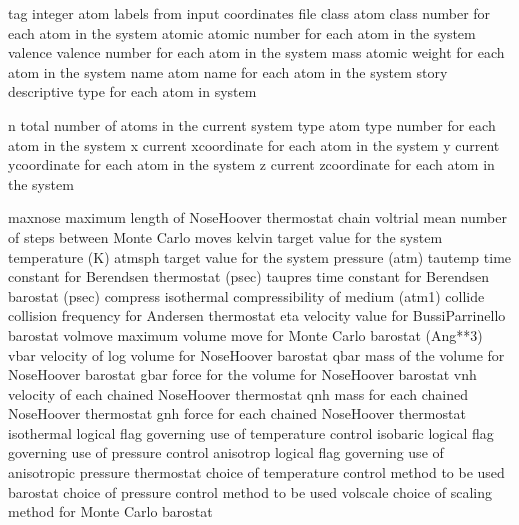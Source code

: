 \documentclass[letterpaper,11pt,english]{sphinxmanual}
\begin{document}

\begin{sphinxVerbatim}[commandchars=\\\{\}]
tag             integer atom labels from input coordinates file
class           atom class number for each atom in the system
atomic          atomic number for each atom in the system
valence         valence number for each atom in the system
mass            atomic weight for each atom in the system
name            atom name for each atom in the system
story           descriptive type for each atom in system
\end{sphinxVerbatim}


\begin{sphinxVerbatim}[commandchars=\\\{\}]
n               total number of atoms in the current system
type            atom type number for each atom in the system
x               current x\PYGZhy{}coordinate for each atom in the system
y               current y\PYGZhy{}coordinate for each atom in the system
z               current z\PYGZhy{}coordinate for each atom in the system
\end{sphinxVerbatim}


\begin{sphinxVerbatim}[commandchars=\\\{\}]
maxnose         maximum length of Nose\PYGZhy{}Hoover thermostat chain
voltrial        mean number of steps between Monte Carlo moves
kelvin          target value for the system temperature (K)
atmsph          target value for the system pressure (atm)
tautemp         time constant for Berendsen thermostat (psec)
taupres         time constant for Berendsen barostat (psec)
compress        isothermal compressibility of medium (atm\PYGZhy{}1)
collide         collision frequency for Andersen thermostat
eta             velocity value for Bussi\PYGZhy{}Parrinello barostat
volmove         maximum volume move for Monte Carlo barostat (Ang**3)
vbar            velocity of log volume for Nose\PYGZhy{}Hoover barostat
qbar            mass of the volume for Nose\PYGZhy{}Hoover barostat
gbar            force for the volume for Nose\PYGZhy{}Hoover barostat
vnh             velocity of each chained Nose\PYGZhy{}Hoover thermostat
qnh             mass for each chained Nose\PYGZhy{}Hoover thermostat
gnh             force for each chained Nose\PYGZhy{}Hoover thermostat
isothermal      logical flag governing use of temperature control
isobaric        logical flag governing use of pressure control
anisotrop       logical flag governing use of anisotropic pressure
thermostat      choice of temperature control method to be used
barostat        choice of pressure control method to be used
volscale        choice of scaling method for Monte Carlo barostat
\end{sphinxVerbatim}
\end{document}
